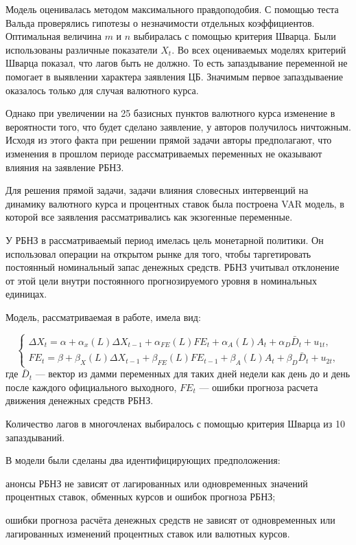 \documentclass[14pt,a4paper, oneside]{extreport}
\newcounter{notes}
\renewenvironment{enumerate}%
{\begin{list}{\arabic{notes})} {\usecounter{notes}%
\setlength{\parsep}{0em}%
\setlength{\itemsep}{0em}%
\setlength{\topsep}{0.75ex}%
\setlength{\parskip}{0em}
}}%
{\end{list}}
\theoremstyle{plain}              %
\theoremstyle{definition}         %
\begin{document}
Модель оценивалась методом максимального правдоподобия. С помощью теста Вальда проверялись гипотезы о незначимости отдельных коэффициентов. Оптимальная величина $m$ и $n$ выбиралась с помощью критерия Шварца. Были использованы различные показатели $X_t$. Во всех оцениваемых моделях критерий Шварца показал, что лагов быть не должно. То есть запаздывание переменной не помогает в выявлении характера заявления ЦБ. Значимым первое запаздываение оказалось только для случая валютного курса. 

Однако при увеличении на 25 базисных пунктов валютного курса изменение в вероятности того, что будет сделано заявление, у авторов получилось ничтожным. Исходя из этого факта при решении прямой задачи авторы предполагают, что изменения в прошлом периоде рассматриваемых переменных не оказывают влияния на заявление РБНЗ.

Для решения прямой задачи, задачи влияния словесных интервенций на динамику валютного курса и процентных ставок была построена VAR модель, в которой все заявления рассматривались как экзогенные переменные.

У РБНЗ в рассматриваемый период имелась цель монетарной политики. Он использовал операции на открытом рынке для того, чтобы таргетировать постоянный номинальный запас денежных средств. РБНЗ учитывал отклонение от этой цели внутри постоянного прогнозируемого уровня в номинальных единицах. 

Модель, рассматриваемая в работе, имела вид: 

\begin{equation}\label{VAR}
\left\{
\begin{aligned}
\Delta X_t = \alpha + \alpha_x (L) \Delta X_{t-1} + \alpha_{FE}(L) FE_t + \alpha_A(L) A_t + \alpha_D \bar D_t + u_{1t}, \\
FE_t = \beta + \beta_X(L) \Delta X_{t-1} + \beta_{FE}(L) FE_{t-1} + \beta_A(L) A_t + \beta_D \bar D_t + u_{2t},
\end{aligned} \right.
\end{equation} где $\bar D_t$ --- вектор из дамми переменных для таких дней недели как день до и день после каждого официального выходного, $FE_t$ --- ошибки прогноза расчета движения денежных средств РБНЗ.

Количество лагов в многочленах выбиралось с помощью критерия Шварца из 10 запаздываний.

В модели были сделаны два идентифицирующих предположения:

\begin{enumerate}

\item анонсы РБНЗ не зависят от лагированных или одновременных значений процентных ставок, обменных курсов и ошибок прогноза РБНЗ;

\item ошибки прогноза расчёта денежных средств не зависят от одновременных или лагированных изменений процентных ставок или валютных курсов. 
\end{enumerate}
\end{document}
